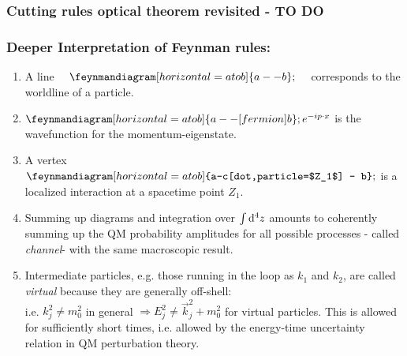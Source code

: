 \subsubsection{Cutting rules optical theorem revisited - TO DO}
\subsubsection{Deeper Interpretation of Feynman rules:}
\begin{enumerate}
	\item A line $\quad \feynmandiagram[horizontal=a to b]{a -- b};\quad $ corresponds to the worldline of a particle.
	\item $\feynmandiagram[horizontal=a to b]{a--[fermion]b};e^{-i p\cdot x}$ is the wavefunction for the momentum-eigenstate.
	\item A vertex $\feynmandiagram[horizontal=a to b]{a--c[dot,particle=$Z_1$] -- b};$ is a localized interaction at a spacetime point $Z_1$.
 	\item Summing up diagrams and integration over $\int \mathrm{d}^4 z$ amounts to coherently summing up the QM probability amplitudes for all possible processes - called \emph{channel}- with the same macroscopic result.
 	\item Intermediate particles, e.g. those running in the loop as $k_1$ and $k_2$, are called \emph{virtual} because they are generally off-shell:\\
 	i.e. $k^2_j \neq m^2_0$ in general $\Rightarrow E^2_j \neq \vec{k}^2_j +m^2_0$ for virtual particles. This is allowed for sufficiently short times, i.e. allowed by the energy-time uncertainty relation in QM perturbation theory.
\end{enumerate}




